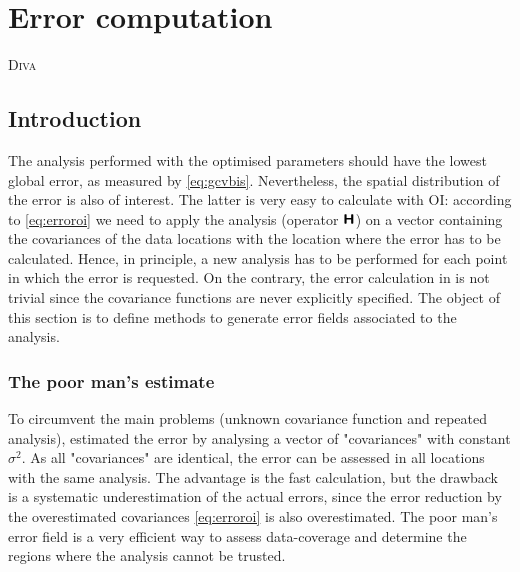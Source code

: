 \chapter{Error computation\label{chap:error}}
\vspace*{-1cm}
\lettrine[lines=2, loversize=-0.1, lraise=0.1]{D}{iva} 

\minitoc


\section{Introduction}


The analysis performed with the optimised parameters should have the lowest global error, as measured by \eqref{eq:gcvbis}. Nevertheless, the spatial distribution of the error is also of interest. The latter is very easy to calculate with OI: according to \eqref{eq:erroroi} we need to apply the analysis (operator $\mbox{\boldmath $ \protect\mathsf{H} $}$) on a vector containing the covariances of the data locations with the location where the error has to be calculated. Hence, in principle, a new analysis has to be performed for each point in which the error is requested. On the contrary, the error calculation in \diva is not trivial since the covariance functions are never explicitly specified. The object of this section is to define methods to generate error fields associated to the analysis. 

\subsection{The poor man's estimate\label{sec:poormans}}

To circumvent the main problems (unknown covariance function and repeated analysis), \citet{BRASSEUR94} estimated the error by analysing a vector of "covariances" with constant $\sigma^2$. As all "covariances" are identical, the error can be assessed in all locations with the same analysis. The advantage is the fast calculation, but the drawback is a systematic underestimation of the actual errors, since the error reduction by the overestimated covariances \eqref{eq:erroroi} is also overestimated. The poor man's error field is a very efficient way to assess data-coverage and determine the regions where the analysis cannot be trusted.

